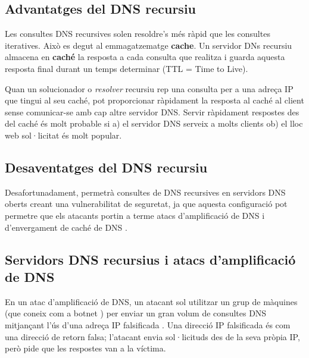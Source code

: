 \documentclass[]{article}
\begin{document}
\hypertarget{advantatges-del-dns-recursiu}{%
\subsection{\texorpdfstring{\textbf{Advantatges del DNS
recursiu}}{Advantatges del DNS recursiu}}\label{advantatges-del-dns-recursiu}}

Les consultes DNS recursives solen resoldre's més ràpid que les
consultes iteratives. Això es degut al emmagatzematge \textbf{cache}. Un
servidor DNs recursiu almacena en \textbf{caché} la resposta a cada
consulta que realitza i guarda aquesta resposta final durant un temps
determinar (TTL = Time to Live).

Quan un solucionador o \emph{resolver} recursiu rep una consulta per a
una adreça IP que tingui al seu caché, pot proporcionar ràpidament la
resposta al caché al client sense comunicar-se amb cap altre servidor
DNS. Servir ràpidament respostes des del caché és molt probable si a) el
servidor DNS serveix a molts clients ob) el lloc web sol·licitat és molt
popular.

\hypertarget{desaventatges-del-dns-recursiu}{%
\subsection{\texorpdfstring{\textbf{Desaventatges del DNS
recursiu}}{Desaventatges del DNS recursiu}}\label{desaventatges-del-dns-recursiu}}

Desafortunadament, permetrà consultes de DNS recursives en servidors DNS
oberts creant una vulnerabilitat de seguretat, ja que aquesta
configuració pot permetre que els atacants portin a terme atacs
d'amplificació de DNS i d'envergament de caché de DNS .

\hypertarget{servidors-dns-recursius-i-atacs-damplificaciuxf3-de-dns}{%
\subsection{\texorpdfstring{\textbf{Servidors DNS recursius i atacs
d'amplificació de
DNS}}{Servidors DNS recursius i atacs d'amplificació de DNS}}\label{servidors-dns-recursius-i-atacs-damplificaciuxf3-de-dns}}

En un atac d'amplificació de DNS, un atacant sol utilitzar un grup de
màquines (que coneix com a botnet ) per enviar un gran volum de
consultes DNS mitjançant l'ús d'una adreça IP falsificada . Una direcció
IP falsificada és com una direcció de retorn falsa; l'atacant envia
sol·licituds des de la seva pròpia IP, però pide que les respostes van a
la víctima.
\end{document}

